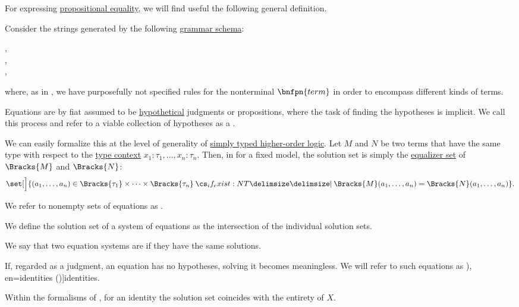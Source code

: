 \begin{definition}\label{def:equation}\mimprovised
  For expressing \hyperref[con:equality]{propositional equality}, we will find useful the following general definition.

  Consider the strings generated by the following \hyperref[def:formal_grammar/schema]{grammar schema}:
  \begin{bnf*}
      {}, \\
     {}, \\
       { \bnfsp \bnftsq{\( \syneq \)} \bnfsp {}},
  \end{bnf*}
  where, as in , we have purposefully not specified rules for the nonterminal \( \bnfpn{term} \) in order to encompass different kinds of terms.

  \begin{thmenum}
     Equations are by fiat assumed to be \hyperref[con:hypothetical_judgment]{hypothetical} judgments or propositions, where the task of finding the hypotheses is implicit. We call this process  and refer to a viable collection of hypotheses as a .

    We can easily formalize this at the level of generality of \hyperref[def:simply_typed_hol]{simply typed higher-order logic}. Let \( M \) and \( N \) be two terms that have the same type with respect to the \hyperref[def:type_context]{type context} \( x_1: \tau_1, \ldots, x_n: \tau_n \). Then, in for a fixed model, the solution set is simply the \hyperref[def:equalizers]{equalizer set} of \( \Bracks{M} \) and \( \Bracks{N} \):
    \begin{equation}\label{eq:def:equation/solution}
      \set[\Big]{ (a_1, \ldots, a_n) \in \Bracks{\tau_1} \times \cdots \times \Bracks{\tau_n} \given* \Bracks{M}(a_1, \ldots, a_n) = \Bracks{N}(a_1, \ldots, a_n) }.
    \end{equation}

     We refer to nonempty sets of equations as .

    We define the solution set of a system of equations as the intersection of the individual solution sets.

     We say that two equation systems are  if they have the same solutions.

     If, regarded as a judgment, an equation has no hypotheses, solving it becomes meaningless. We will refer to such equations as \term[bg=тъждества (\cite[2]{Обрешков1962ВисшаАлгебра}), en=identities (\cite[50]{BaaderNipkow2012TermRewriting})]{identities}.

    Within the formalisms of , for an identity the solution set coincides with the entirety of \( X \).
  \end{thmenum}
\end{definition}
